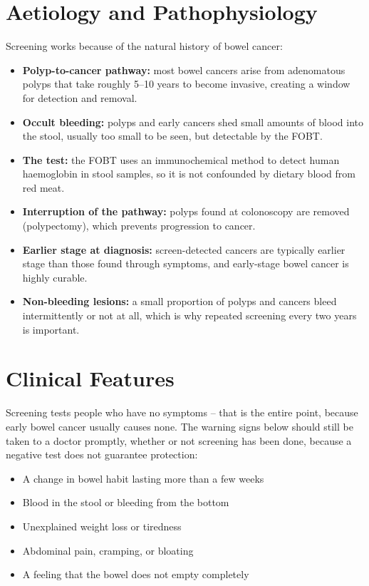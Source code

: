 \section*{Aetiology and Pathophysiology}
Screening works because of the natural history of bowel cancer:
\begin{itemize}
    \item \textbf{Polyp-to-cancer pathway:} most bowel cancers arise from adenomatous polyps that take roughly 5--10 years to become invasive, creating a window for detection and removal.
    \item \textbf{Occult bleeding:} polyps and early cancers shed small amounts of blood into the stool, usually too small to be seen, but detectable by the FOBT.
    \item \textbf{The test:} the FOBT uses an immunochemical method to detect human haemoglobin in stool samples, so it is not confounded by dietary blood from red meat.
    \item \textbf{Interruption of the pathway:} polyps found at colonoscopy are removed (polypectomy), which prevents progression to cancer.
    \item \textbf{Earlier stage at diagnosis:} screen-detected cancers are typically earlier stage than those found through symptoms, and early-stage bowel cancer is highly curable.
    \item \textbf{Non-bleeding lesions:} a small proportion of polyps and cancers bleed intermittently or not at all, which is why repeated screening every two years is important.
\end{itemize}

\section*{Clinical Features}
Screening tests people who have no symptoms -- that is the entire point, because early bowel cancer usually causes none. The warning signs below should still be taken to a doctor promptly, whether or not screening has been done, because a negative test does not guarantee protection:
\begin{itemize}
    \item A change in bowel habit lasting more than a few weeks
    \item Blood in the stool or bleeding from the bottom
    \item Unexplained weight loss or tiredness
    \item Abdominal pain, cramping, or bloating
    \item A feeling that the bowel does not empty completely
\end{itemize}


